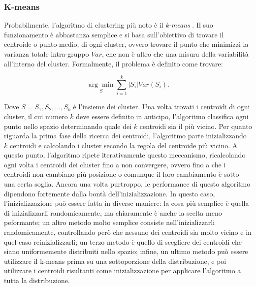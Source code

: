 \subsubsection{K-means}
Probabilmente, l'algoritmo di clustering più noto è il \textit{k-means} \cite{lloyd1982least, macqueen1967some}. Il suo funzionamento è abbastanza semplice e si basa sull'obiettivo di trovare il centroide o punto medio, di ogni cluster, ovvero trovare il punto che minimizzi la varianza totale intra-gruppo $Var$, che non è altro che una misura della variabilità all'interno del cluster. Formalmente, il problema è definito come trovare:

\begin{equation}
    \underset{S}{\arg\min} \sum_{i=1}^{k}{|S_{i}| Var(S_{i})}.
\end{equation}

Dove $S={S_{1},S_{2},..., S_{k}}$ è l'insieme dei cluster. Una volta trovati i centroidi di ogni cluster, il cui numero $k$ deve essere definito in anticipo, l'algoritmo classifica ogni punto nello spazio determinando quale dei $k$ centroidi sia il più vicino. Per quanto riguarda la prima fase della ricerca dei centroidi, l'algoritmo parte inizializzando $k$ centroidi e calcolando i cluster secondo la regola del centroide più vicino. A questo punto, l'algoritmo ripete iterativamente questo meccanismo, ricalcolando ogni volta i centroidi dei cluster fino a non convergere, ovvero fino a che i centroidi non cambiano più posizione o comunque il loro cambiamento è sotto una certa soglia.
Ancora una volta purtroppo, le performance di questo algoritmo dipendono fortemente dalla bontà dell'inizializzazione. In questo caso, l'inizializzazione può essere fatta in diverse maniere: la cosa più semplice è quella di inizializzarli randomicamente, ma chiaramente è anche la scelta meno peformante; un altro metodo molto semplice consiste nell'inizializzarli randomicamente, controllando però che nessuno dei centroidi sia molto vicino e in quel caso reinizializzarli; un terzo metodo è quello di scegliere dei centroidi che siano uniformemente distribuiti nello spazio; infine, un ultimo metodo può essere utilizzare il k-means prima su una sottoporzione della distribuzione, e poi utilizzare i centroidi risultanti come inizializzazione per applicare l'algoritmo a tutta la distribuzione.

